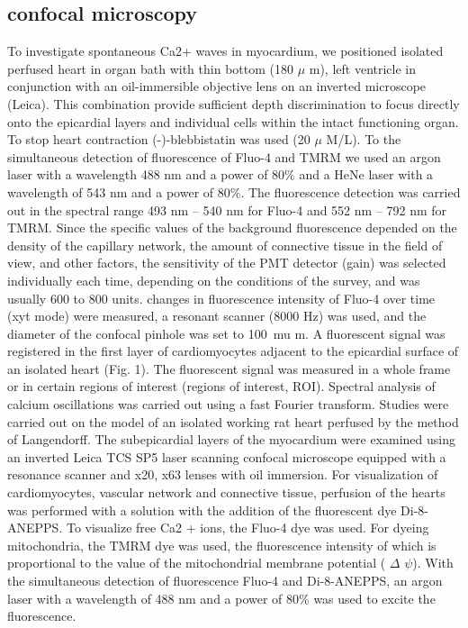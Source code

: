 \documentclass[a4paper,12pt]{article}
\begin{document}
\subsection{confocal microscopy}
To investigate spontaneous Ca2+ waves in myocardium, we positioned isolated perfused heart in organ bath with thin bottom (180 $\mu$ m), left ventricle in conjunction with an oil-immersible objective lens on an inverted microscope (Leica).
This combination provide sufficient depth discrimination to focus directly onto the epicardial layers and individual cells within the intact functioning organ.
To stop heart contraction (-)-blebbistatin was used (20 $\mu$ M/L).
To the simultaneous detection of fluorescence of Fluo-4 and TMRM we used an argon laser with a wavelength 488 nm and a power of 80\% and a HeNe laser with a wavelength of 543 nm and a power of 80\%.
The fluorescence detection was carried out in the spectral range 493 nm -- 540 nm for Fluo-4 and 552 nm -- 792 nm for TMRM. Since the specific values of the background fluorescence depended on the density of the capillary network, the amount of connective tissue in the field of view, and other factors, the sensitivity of the PMT detector (gain) was selected individually each time, depending on the conditions of the survey, and was usually 600 to 800 units.
changes in fluorescence intensity of Fluo-4 over time (xyt mode) were measured, a resonant scanner (8000 Hz) was used, and the diameter of the confocal pinhole was set to 100\ mu m.
A fluorescent signal was registered in the first layer of cardiomyocytes adjacent to the epicardial surface of an isolated heart (Fig. 1). The fluorescent signal was measured in a whole frame or in certain regions of interest (regions of interest, ROI).
Spectral analysis of calcium oscillations was carried out using a fast Fourier transform.
Studies were carried out on the model of an isolated working rat heart perfused by the method of Langendorff.
The subepicardial layers of the myocardium were examined using an inverted Leica TCS SP5 laser scanning confocal microscope equipped with a resonance scanner and x20, x63 lenses with oil immersion.
For visualization of cardiomyocytes, vascular network and connective tissue, perfusion of the hearts was performed with a solution with the addition of the fluorescent dye Di-8-ANEPPS.
To visualize free Ca2 + ions, the Fluo-4 dye was used.
For dyeing mitochondria, the TMRM dye was used, the fluorescence intensity of which is proportional to the value of the mitochondrial membrane potential ( $\Delta$ $\psi$).
With the simultaneous detection of fluorescence Fluo-4 and Di-8-ANEPPS, an argon laser with a wavelength of 488 nm and a power of 80\% was used to excite the fluorescence.
\end{document}
